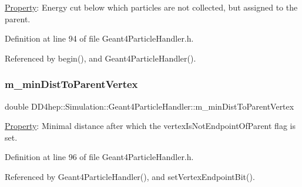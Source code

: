 \hyperlink{class_d_d4hep_1_1_property}{Property}\+: Energy cut below which particles are not collected, but assigned to the parent. 



Definition at line 94 of file Geant4\+Particle\+Handler.\+h.



Referenced by begin(), and Geant4\+Particle\+Handler().

\hypertarget{class_d_d4hep_1_1_simulation_1_1_geant4_particle_handler_ac60a7876123ba7481d080a4ef284a730}{}\label{class_d_d4hep_1_1_simulation_1_1_geant4_particle_handler_ac60a7876123ba7481d080a4ef284a730} 
\subsubsection{\texorpdfstring{m\+\_\+min\+Dist\+To\+Parent\+Vertex}{m\_minDistToParentVertex}}
{\footnotesize\ttfamily double D\+D4hep\+::\+Simulation\+::\+Geant4\+Particle\+Handler\+::m\+\_\+min\+Dist\+To\+Parent\+Vertex\hspace{0.3cm}{\ttfamily [protected]}}



\hyperlink{class_d_d4hep_1_1_property}{Property}\+: Minimal distance after which the vertex\+Is\+Not\+Endpoint\+Of\+Parent flag is set. 



Definition at line 96 of file Geant4\+Particle\+Handler.\+h.



Referenced by Geant4\+Particle\+Handler(), and set\+Vertex\+Endpoint\+Bit().

\hypertarget{class_d_d4hep_1_1_simulation_1_1_geant4_particle_handler_a81a2c3bad5037dd9fcffdf233f7c69e2}{}\label{class_d_d4hep_1_1_simulation_1_1_geant4_particle_handler_a81a2c3bad5037dd9fcffdf233f7c69e2} 

